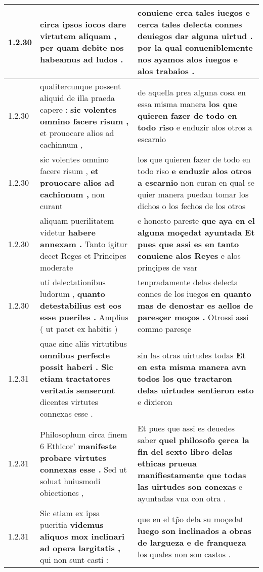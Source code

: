 \begin{tabular}{|p{1cm}|p{6.5cm}|p{6.5cm}|}
1.2.30 & circa ipsos iocos \textbf{ dare virtutem aliquam , } per quam debite nos habeamus ad ludos . & conuiene erca tales iuegos \textbf{ e cerca tales delecta connes deuiegos dar alguna uirtud . } por la qual conueniblemente nos ayamos alos iuegos e alos trabaios . \\\hline
1.2.30 & qualitercunque possent aliquid de illa praeda capere : \textbf{ sic volentes omnino facere risum , } et prouocare alios ad cachinnum , & de aquella prea alguna cosa en essa misma manera \textbf{ los que quieren fazer de todo en todo riso } e enduzir alos otros a escarnio \\\hline
1.2.30 & sic volentes omnino facere risum , \textbf{ et prouocare alios ad cachinnum , } non curant & los que quieren fazer de todo en todo riso \textbf{ e enduzir alos otros a escarnio } non curan en qual se quier manera puedan tomar los dichos o los fechos de los otros \\\hline
1.2.30 & aliquam puerilitatem videtur \textbf{ habere annexam . } Tanto igitur decet Reges et Principes moderate & e honesto pareste \textbf{ que aya en el alguna moçedat ayuntada Et pues que assi es en tanto conuiene alos Reyes } e alos prinçipes de vsar \\\hline
1.2.30 & uti delectationibus ludorum , \textbf{ quanto detestabilius est eos esse pueriles . } Amplius ( ut patet ex habitis ) & tenpradamente delas delecta connes de los iuegos \textbf{ en quanto mas de denostar es aellos de paresçer moços . } Otrossi assi commo paresçe \\\hline
1.2.31 & quae sine aliis virtutibus \textbf{ omnibus perfecte possit haberi . Sic etiam tractatores veritatis senserunt } dicentes virtutes connexas esse . & sin las otras uirtudes todas \textbf{ Et en esta misma manera avn todos los que tractaron delas uirtudes sentieron esto } e dixieron \\\hline
1.2.31 & Philosophum circa finem 6 Ethicor’ \textbf{ manifeste probare virtutes connexas esse . } Sed ut soluat huiusmodi obiectiones , & Et pues que assi es deuedes saber \textbf{ quel philosofo çerca la fin del sexto libro delas ethicas prueua manifiestamente que todas las uirtudes son conexas } e ayuntadas vna con otra . \\\hline
1.2.31 & Sic etiam ex ipsa pueritia \textbf{ videmus aliquos mox inclinari ad opera largitatis , } qui non sunt casti : & que en el tp̃o dela su moçedat \textbf{ luego son inclinados a obras de largueza e de franqueza } los quales non son castos . \\\hline

\end{tabular}

